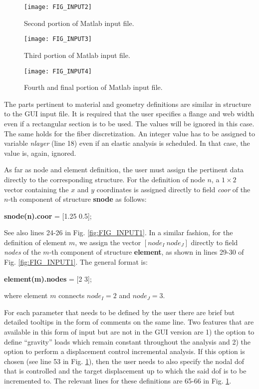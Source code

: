 \begin{appendices}
\begin{figure}
	\centering
	\texttt{[image: FIG\_INPUT2]}
	\caption{Second portion of Matlab input file.}
	\label{fig:FIG_INPUT2}
\end{figure}

\begin{figure}
	\centering
	\texttt{[image: FIG\_INPUT3]}
	\caption{Third portion of Matlab input file.}
	\label{fig:FIG_INPUT3}
\end{figure}

\begin{figure}
	\centering
	\texttt{[image: FIG\_INPUT4]}
	\caption{Fourth and final portion of Matlab input file.}
	\label{fig:FIG_INPUT4}
\end{figure}

The parts pertinent to material and geometry definitions are similar in 
structure to the GUI input file. It is required that the user specifies a 
flange and web width even if a rectangular section is to be used. The values 
will be ignored in this case. The same holds for the fiber discretization. An 
integer value has to be assigned to variable \textit{nlayer} (line 18) even if 
an elastic analysis is scheduled. In that case, the value is, again, ignored.

As far as node and element definition, the user must assign the pertinent data 
directly to the corresponding structure. For the definition of 
node $n$, a $1\times 2$ vector containing the $x$ and $y$ coordinates is 
assigned directly to field \textit{coor} of the $n$-th component of structure 
\textbf{snode} as follows:
\begin{center}
	\textbf{snode(n).coor} = [1.25 0.5];
\end{center}

\noindent See also lines 24-26 in Fig. \ref{fig:FIG_INPUT1}. In a similar 
fashion, for the definition of element $m$, we assign the vector $[node_I\  
node_J]$ directly to field \textit{nodes} of the $m$-th component of structure 
\textbf{element}, as shown in lines 29-30 of Fig. \ref{fig:FIG_INPUT1}. The 
general format is:

\begin{center}
	\textbf{element(m).nodes} = [2 3];
\end{center}
\noindent where element $m$ connects $node_I=2$ and $node_J=3$.

For each parameter that needs to be defined by the user there are brief but 
detailed tooltips in the form of comments on the same line. Two features that 
are available in this form of input but are not in the GUI version are 1) the 
option to define ``gravity'' loads which remain constant throughout the 
analysis and 2) the option to perform a displacement control incremental 
analysis. If this option is chosen (see line 53 in Fig. \ref{fig:FIG_INPUT2}), 
then the user needs to also specify the nodal \acrshort{dof} that is controlled 
and the target displacement up to which the said \acrshort{dof} is to be 
incremented to. The relevant lines for these definitions are 65-66 in Fig. 
\ref{fig:FIG_INPUT2}.


\end{appendices}
